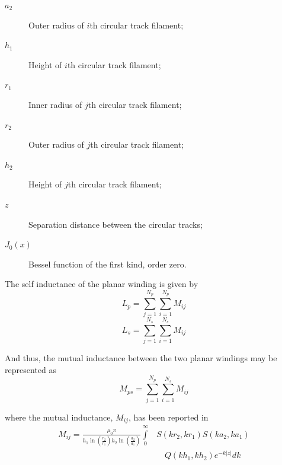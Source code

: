 \documentclass[conference]{IEEEtran}
\begin{document}
\begin{description}
\item[\hspace{-10pt}$ a_{2} $]    \hspace{-15pt} Outer radius of $i$th circular track filament;
\item[\hspace{-10pt}$ h_{1} $]    \hspace{-15pt} Height of $i$th circular track filament;
\item[\hspace{-10pt}$ r_{1} $]    \hspace{-15pt} Inner radius of $j$th circular track filament;
\item[\hspace{-10pt}$ r_{2} $]    \hspace{-15pt} Outer radius of $j$th circular track filament;
\item[\hspace{-10pt}$ h_{2} $]    \hspace{-15pt} Height of $j$th circular track filament;
\item[\hspace{-10pt}$ z $]        \hspace{-15pt} Separation distance between the circular tracks;
\item[\hspace{-10pt}$ J_{0}(x) $] \hspace{-15pt} Bessel function of the first kind, order zero.
\end{description}

\hspace{-20pt} The self inductance of the planar winding is given by
\begin{equation}
	L_{p} = \sum\limits_{j=1}^{N_{p}}{\sum\limits_{i=1}^{N_{p}}{M_{ij}}}
\end{equation}
%
\begin{equation}
	L_{s} = \sum\limits_{j=1}^{N_{s}}{\sum\limits_{i=1}^{N_{s}}{M_{ij}}}
\end{equation}

\hspace{-20pt} And thus, the mutual inductance between the two planar windings may be represented as
%
\begin{equation}
	M_{ps} = \sum\limits_{j=1}^{N_{p}}{\sum\limits_{i=1}^{N_{s}}{M_{ij}}}
\end{equation}

\hspace{-20pt} where the mutual inductance, $ M_{ij} $, has been reported in \cite{HurleyDuffy}
\begin{equation}
\begin{split}
	M_{ij} = \frac{\mu_{0}\pi}{h_{1}\ln(\frac{r_{2}}{r_{1}})h_{2}\ln(\frac{a_{2}}{a_{1}})}\int\limits_{0}^{\infty} & S(kr_{2},kr_{1})S(ka_{2},ka_{1}) 
	\\ &\quad {Q(kh_{1},kh_{2})e^{-k|z|}dk}
\end{split}
\end{equation}
\end{document}
